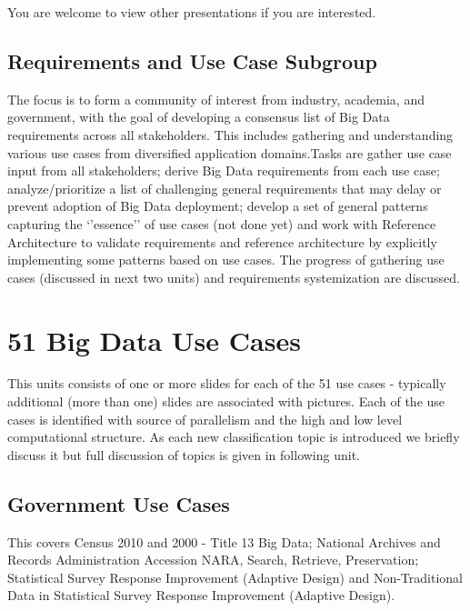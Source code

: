 You are welcome to view other presentations if you are interested.

\subsection{Requirements and Use Case Subgroup}

The focus is to form a community of interest from industry, academia,
and government, with the goal of developing a consensus list of Big Data
requirements across all stakeholders. This includes gathering and
understanding various use cases from diversified application
domains.Tasks are gather use case input from all stakeholders; derive
Big Data requirements from each use case; analyze/prioritize a list of
challenging general requirements that may delay or prevent adoption of
Big Data deployment; develop a set of general patterns capturing the
`'essence'' of use cases (not done yet) and work with Reference
Architecture to validate requirements and reference architecture by
explicitly implementing some patterns based on use cases. The progress
of gathering use cases (discussed in next two units) and requirements
systemization are discussed.




\section{51 Big Data Use Cases}

This units consists of one or more slides for each of the 51 use cases -
typically additional (more than one) slides are associated with
pictures. Each of the use cases is identified with source of parallelism
and the high and low level computational structure. As each new
classification topic is introduced we briefly discuss it but full
discussion of topics is given in following unit.




\subsection{Government Use Cases}

This covers Census 2010 and 2000 - Title 13 Big Data; National Archives
and Records Administration Accession NARA, Search, Retrieve,
Preservation; Statistical Survey Response Improvement (Adaptive Design)
and Non-Traditional Data in Statistical Survey Response Improvement
(Adaptive Design).


